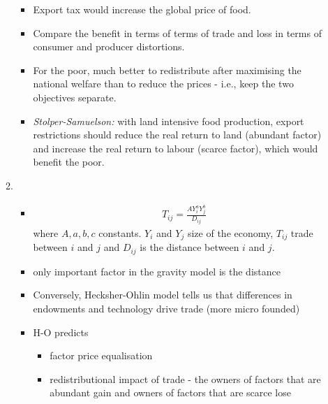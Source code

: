 \begin{enumerate}
\begin{enumerate}
		\begin{itemize}
			\item Export tax would increase the global price of food.
			\item Compare the benefit in terms of terms of trade and loss in terms of consumer and producer distortions.
			\item For the poor, much better to redistribute after maximising the national welfare than to reduce the prices - i.e., keep the two objectives separate. 
			\item \emph{Stolper-Samuelson:} with land intensive food production, export restrictions should reduce the real return to land (abundant factor) and increase the real return to labour (scarce factor), which would benefit the poor.
		\end{itemize}
		\item {}
		\begin{itemize}
			\item 
			\begin{align*}
				T_{ij} = \frac{A Y_{i}^{a}Y_{j}^{b}}{D_{ij}}
			\end{align*}
			where $A,a,b,c$ constants. $Y_{i}$ and $Y_{j}$ size of the economy, $T_{ij}$ trade between $i$ and $j$ and $D_{ij}$ is the distance between $i$ and $j$.
			\item only important factor in the gravity model is the distance
			\item Conversely, Hecksher-Ohlin model tells us that differences in endowments and technology drive trade (more micro founded)
			\item H-O predicts 
			\begin{itemize}
				\item factor price equalisation
				\item redistributional impact of trade - the owners of factors that are abundant gain and owners of factors that are scarce lose
			\end{itemize}
		\end{itemize}
	\end{enumerate}
\end{enumerate}